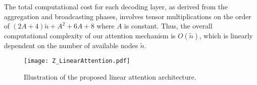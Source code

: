 The total computational cost for each decoding layer, as derived from the aggregation and broadcasting phases, involves tensor multiplications on the order of $(2A+4)\tilde{n}+A^2+6A+8$  where $A$ is constant. 
Thus, the overall computational complexity of our attention mechanism is ${O}(\tilde{n})$, which is linearly dependent on the number of available nodes $\tilde{n}$.

\begin{figure}[t]
\centering
\texttt{[image: Z\_LinearAttention.pdf]}
\caption{Illustration of the proposed linear attention architecture.}
\label{fig:LinearAttention}
\end{figure}
